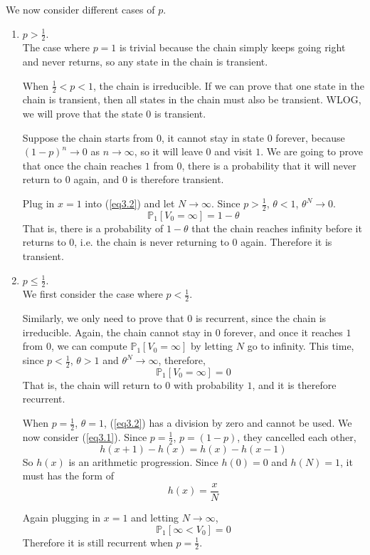     We now consider different cases of $p$.
    \begin{enumerate}
        \item $p > \frac{1}{2}$.\\
        The case where $p=1$ is trivial because the chain simply keeps going right and never returns, so any state in the chain is transient.

        When $\frac{1}{2} < p < 1$, the chain is irreducible. If we can prove that one state in the chain is transient, then all states in the chain must also be transient. WLOG, we will prove that the state $0$ is transient.

        Suppose the chain starts from $0$, it cannot stay in state $0$ forever, because $(1-p)^n \to 0$ as $n\to\infty$, so it will leave $0$ and visit $1$. We are going to prove that once the chain reaches $1$ from $0$, there is a probability that it will never return to $0$ again, and $0$ is therefore transient.

        Plug in $x=1$ into (\ref{eq3.2}) and let $N \to \infty$. Since $p > \frac{1}{2}$, $\theta < 1$, $\theta^N \to 0$.
        \[ \mathbb{P}_1[V_0 = \infty] = 1-\theta \]
        That is, there is a probability of $1-\theta$ that the chain reaches infinity before it returns to $0$, i.e. the chain is never returning to $0$ again. Therefore it is transient.

        \item $p \le \frac{1}{2}$.\\
        We first consider the case where $p < \frac{1}{2}$.

        Similarly, we only need to prove that $0$ is recurrent, since the chain is irreducible. Again, the chain cannot stay in $0$ forever, and once it reaches $1$ from $0$, we can compute $\mathbb{P}_1[V_0 = \infty]$ by letting $N$ go to infinity. This time, since $p < \frac{1}{2}$, $\theta > 1$ and $\theta^N \to \infty$, therefore,
        \[ \mathbb{P}_1[V_0 = \infty] = 0 \]
        That is, the chain will return to $0$ with probability $1$, and it is therefore recurrent.

        When $p = \frac{1}{2}$, $\theta = 1$, (\ref{eq3.2}) has a division by zero and cannot be used. We now consider (\ref{eq3.1}). Since $p=\frac{1}{2}$, $p = (1-p)$, they cancelled each other,
        \[ h(x+1) - h(x) = h(x) - h(x-1) \]
        So $h(x)$ is an arithmetic progression. Since $h(0)=0$ and $h(N)=1$, it must has the form of
        \[ h(x) = \frac{x}{N} \]
        
        Again plugging in $x=1$ and letting $N \to \infty$,
        \[ \mathbb{P}_1[\infty < V_0] = 0 \]
        Therefore it is still recurrent when $p = \frac{1}{2}$.


\end{enumerate}
